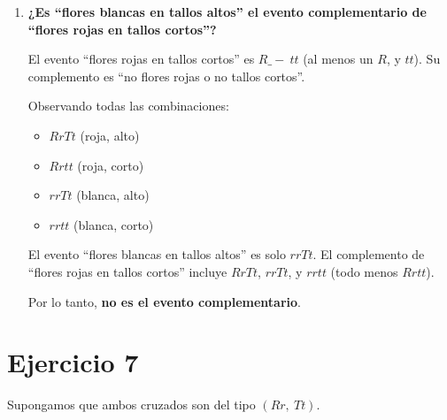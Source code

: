 \documentclass{article}
\begin{document}
\begin{enumerate}[label=\alph*)]
    \item \textbf{¿Es ``flores blancas en tallos altos'' el evento complementario de ``flores rojas en tallos cortos''?}

    El evento ``flores rojas en tallos cortos'' es $R\_-\ tt$ (al menos un $R$, y $tt$). Su complemento es ``no flores rojas o no tallos cortos''.

    Observando todas las combinaciones:
    \begin{itemize}
        \item $RrTt$ (roja, alto)
        \item $Rrtt$ (roja, corto)
        \item $rrTt$ (blanca, alto)
        \item $rrtt$ (blanca, corto)
    \end{itemize}

    El evento ``flores blancas en tallos altos'' es solo $rrTt$. El complemento de ``flores rojas en tallos cortos'' incluye $RrTt$, $rrTt$, y $rrtt$ (todo menos $Rrtt$).

    Por lo tanto, \textbf{no es el evento complementario}.

\end{enumerate}
\section*{Ejercicio 7}

Supongamos que ambos cruzados son del tipo $(Rr,\ Tt)$.
\end{document}
